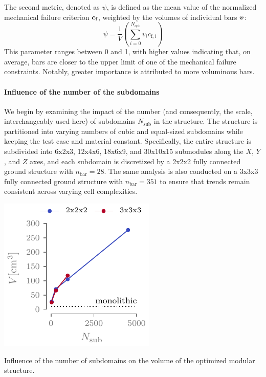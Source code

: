 The second metric, denoted as $\psi$, is defined as the mean value of the normalized mechanical failure criterion $\bm{c}_\text{f}$, weighted by the volumes of individual bars $\bm{v}$:
\begin{equation}
    \psi = \frac{1}{V} \left( \sum_{i=0}^{N_\text{opt}} v_i c_{\text{f},i} \right)
\end{equation}
This parameter ranges between 0 and 1, with higher values indicating that, on average, bars are closer to the upper limit of one of the mechanical failure constraints. Notably, greater importance is attributed to more voluminous bars.

\paragraph{Influence of the number of the subdomains}
We begin by examining the impact of the number (and consequently, the scale, interchangeably used here) of subdomains $N_\text{sub}$ in the structure. The structure is partitioned into varying numbers of cubic and equal-sized subdomains while keeping the test case and material constant. Specifically, the entire structure is subdivided into 6x2x3, 12x4x6, 18x6x9, and 30x10x15 submodules along the $X$, $Y$, and $Z$ axes, and each subdomain is discretized by a 2x2x2 fully connected ground structure with $n_{\text{bar}} = 28$. The same analysis is also conducted on a 3x3x3 fully connected ground structure with $n_{\text{bar}} = 351$ to ensure that trends remain consistent across varying cell complexities.

\begin{marginfigure}
    \centering
    \includegraphics{figures/05_cellular_opt/00_module_scale_tab/scale_tab_v.pdf}
    \caption{Influence of the number of subdomains on the volume of the optimized modular structure.}
    \label{fig:05_scale_v}
\end{marginfigure}

